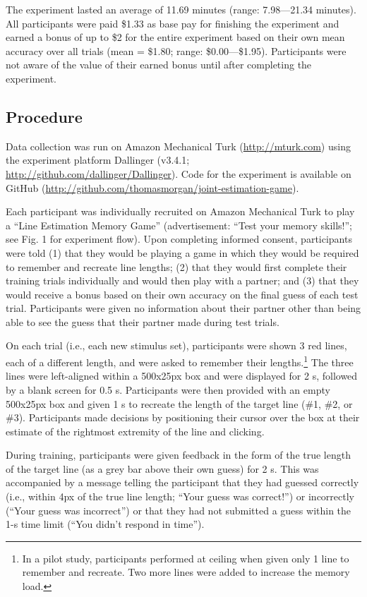 \documentclass[10pt, letterpaper]{article}
\begin{document}
The experiment lasted an average of 11.69 minutes (range: 7.98---21.34
minutes). All participants were paid \$1.33 as base pay for finishing
the experiment and earned a bonus of up to \$2 for the entire experiment
based on their own mean accuracy over all trials (mean = \$1.80; range:
\$0.00---\$1.95). Participants were not aware of the value of their
earned bonus until after completing the experiment.

\subsection{Procedure}\label{procedure}

Data collection was run on Amazon Mechanical Turk
(\url{http://mturk.com}) using the experiment platform Dallinger
(v3.4.1; \url{http://github.com/dallinger/Dallinger}). Code for the
experiment is available on GitHub
(\url{http://github.com/thomasmorgan/joint-estimation-game}).

Each participant was individually recruited on Amazon Mechanical Turk to
play a ``Line Estimation Memory Game'' (advertisement: ``Test your
memory skills!''; see Fig. 1 for experiment flow). Upon completing
informed consent, participants were told (1) that they would be playing
a game in which they would be required to remember and recreate line
lengths; (2) that they would first complete their training trials
individually and would then play with a partner; and (3) that they would
receive a bonus based on their own accuracy on the final guess of each
test trial. Participants were given no information about their partner
other than being able to see the guess that their partner made during
test trials.

On each trial (i.e., each new stimulus set), participants were shown 3
red lines, each of a different length, and were asked to remember their
lengths.\footnote{In a pilot study, participants performed at ceiling when given only 1 line to remember and recreate. Two more lines were added to increase the memory load.}
The three lines were left-aligned within a 500x25px box and were
displayed for 2 s, followed by a blank screen for 0.5 s. Participants
were then provided with an empty 500x25px box and given 1 s to recreate
the length of the target line (\#1, \#2, or \#3). Participants made
decisions by positioning their cursor over the box at their estimate of
the rightmost extremity of the line and clicking.

During training, participants were given feedback in the form of the
true length of the target line (as a grey bar above their own guess) for
2 s. This was accompanied by a message telling the participant that they
had guessed correctly (i.e., within 4px of the true line length; ``Your
guess was correct!'') or incorrectly (``Your guess was incorrect'') or
that they had not submitted a guess within the 1-s time limit (``You
didn't respond in time'').
\end{document}
